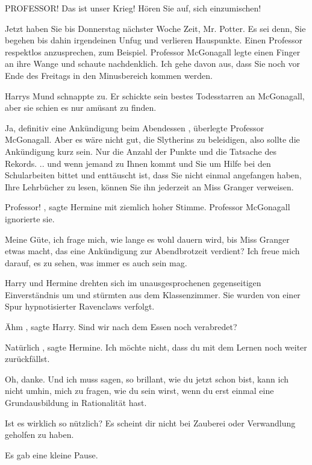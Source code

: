 \glqq PROFESSOR! Das ist unser Krieg! Hören Sie auf, sich einzumischen!\grqq{}

\glqq Jetzt haben Sie bis Donnerstag nächster Woche Zeit, Mr. Potter. Es sei
denn, Sie begehen bis dahin irgendeinen Unfug und verlieren Hauspunkte. Einen
Professor respektlos anzusprechen, zum Beispiel.\grqq{} Professor McGonagall
legte einen Finger an ihre Wange und schaute nachdenklich. \glqq Ich gehe davon
aus, dass Sie noch vor Ende des Freitags in den Minusbereich kommen
werden.\grqq{}

Harrys Mund schnappte zu. Er schickte sein bestes Todesstarren an McGonagall,
aber sie schien es nur amüsant zu finden.

\glqq Ja, definitiv eine Ankündigung beim Abendessen\grqq{} , überlegte
Professor McGonagall. \glqq Aber es wäre nicht gut, die Slytherins zu
beleidigen, also sollte die Ankündigung kurz sein. Nur die Anzahl der Punkte und
die Tatsache des Rekords. .. und wenn jemand zu Ihnen kommt und Sie um Hilfe bei
den Schularbeiten bittet und enttäuscht ist, dass Sie nicht einmal angefangen
haben, Ihre Lehrbücher zu lesen, können Sie ihn jederzeit an Miss Granger
verweisen.\grqq{}

\glqq Professor!\grqq{} , sagte Hermine mit ziemlich hoher Stimme. Professor
McGonagall ignorierte sie.

\glqq Meine Güte, ich frage mich, wie lange es wohl dauern wird, bis Miss
Granger etwas macht, das eine Ankündigung zur Abendbrotzeit verdient? Ich freue
mich darauf, es zu sehen, was immer es auch sein mag.\grqq{}

Harry und Hermine drehten sich im unausgesprochenen gegenseitigen Einverständnis
um und stürmten aus dem Klassenzimmer. Sie wurden von einer Spur hypnotisierter
Ravenclaws verfolgt.

\glqq Ähm\grqq{} , sagte Harry. \glqq Sind wir nach dem Essen noch
verabredet?\grqq{}

\glqq Natürlich\grqq{} , sagte Hermine. \glqq Ich möchte nicht, dass du mit dem
Lernen noch weiter zurückfällst.\grqq{}

\glqq Oh, danke. Und ich muss sagen, so brillant, wie du jetzt schon bist, kann
ich nicht umhin, mich zu fragen, wie du sein wirst, wenn du erst einmal eine
Grundausbildung in Rationalität hast.\grqq{}

\glqq Ist es wirklich so nützlich? Es scheint dir nicht bei Zauberei oder
Verwandlung geholfen zu haben.\grqq{}

Es gab eine kleine Pause.


